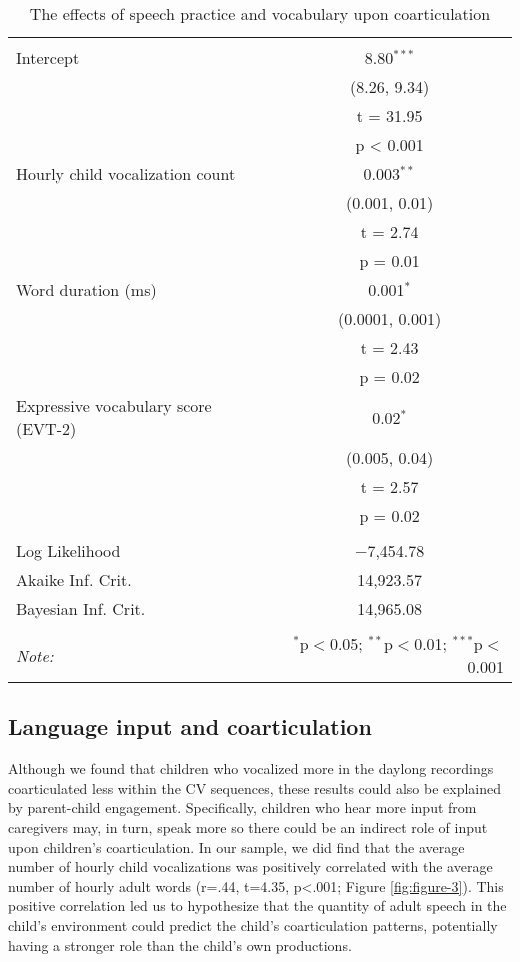 \documentclass[a4paper,man,natbib,donotrepeattitle, apacite]{apa6}
\begin{document}
\begin{table}[!htbp] \centering 
  \caption{The effects of speech practice and vocabulary upon coarticulation} 
  \label{tab:model-2} 
\begin{tabular}{@{\extracolsep{5pt}}lc} 
\\[-1.8ex]\hline 
\hline \\[-1.8ex] 
 Intercept & 8.80$^{***}$ \\ 
  & (8.26, 9.34) \\ 
  & t = 31.95 \\ 
  & p < 0.001 \\ 
  Hourly child vocalization count & 0.003$^{**}$ \\ 
  & (0.001, 0.01) \\ 
  & t = 2.74 \\ 
  & p = 0.01 \\ 
  Word duration (ms) & 0.001$^{*}$ \\ 
  & (0.0001, 0.001) \\ 
  & t = 2.43 \\ 
  & p = 0.02 \\ 
  Expressive vocabulary score (EVT-2) & 0.02$^{*}$ \\ 
  & (0.005, 0.04) \\ 
  & t = 2.57 \\ 
  & p = 0.02 \\ 
 \hline \\[-1.8ex] 
Log Likelihood & $-$7,454.78 \\ 
Akaike Inf. Crit. & 14,923.57 \\ 
Bayesian Inf. Crit. & 14,965.08 \\ 
\hline 
\hline \\[-1.8ex] 
\textit{Note:}  & \multicolumn{1}{r}{$^{*}$p$<$0.05; $^{**}$p$<$0.01; $^{***}$p$<$0.001} \\ 
\end{tabular} 
\end{table} 


\subsection{Language input and coarticulation}

Although we found that children who vocalized more in the daylong recordings coarticulated less within the CV sequences, these results could also be explained by parent-child engagement. Specifically, children who hear more input from caregivers may, in turn, speak more so there could be an indirect role of input upon children's coarticulation. In our sample, we did find that the average number of hourly child vocalizations was positively correlated with the average number of hourly adult words (r=.44, t=4.35, p<.001; Figure \ref{fig:figure-3}). This positive correlation led us to hypothesize that the quantity of adult speech in the child’s environment could predict the child’s coarticulation patterns, potentially having a stronger role than the child’s own productions.
\end{document}
